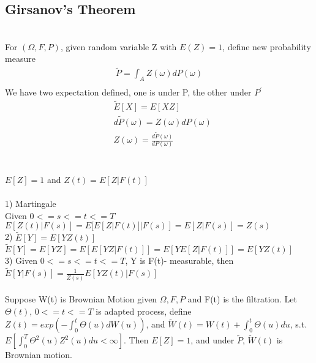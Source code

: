 \documentclass[a4paper]{article}
\begin{document}
\subsection{Girsanov's Theorem}
\\
For $(\Omega, F, P)$, given random variable Z with $E(Z) = 1$, define new probability measure
\begin{align}
	\tilde P = \int_A Z(\omega) dP(\omega)\\
\end{align}
We have two expectation defined, one is under P, the other under $P^{'}$
\begin{align*}
	&\tilde E[X] = E[XZ]\\ 
	&d\tilde P(\omega) = Z(\omega) dP(\omega)\\
	&Z(\omega) = \frac{d\tilde P(\omega)}{dP(\omega)}\\
\end{align*}

\\
$E[Z] = 1$ and $Z(t) = E[Z|F(t)]$\\

\\
1) Martingale\\
Given $0 <= s <=t <= T$\\
$E[Z(t)|F(s)] = E[E[Z|F(t)]|F(s)] = E[Z|F(s)] = Z(s)$\\
2) $\tilde E[Y] = E[YZ(t)]$\\
$\tilde E[Y]=E[YZ] = E[E[YZ|F(t)]]=E[Y E[Z|F(t)]] = E[YZ(t)]$\\
3) Given $0<=s<=t<=T$, Y is F(t)- measurable, then\\
$\tilde E[Y|F(s)] = \frac{1}{Z(s)} E[YZ(t)|F(s)]$\\

\\
Suppose W(t) is Brownian Motion given $\Omega, F, P$ and F(t) is the filtration. Let $\Theta(t)$, $0<=t<=T$ is adapted process, define $Z(t) = exp(-\int_0^{t} \Theta(u) dW(u))$, and $\tilde W(t) = W(t) + \int_0^t \Theta(u) du$, s.t. $E[\int_0^T \Theta^2(u) Z^2(u) du < \infty]$. Then $E[Z]=1$, and under $\tilde P$, $\tilde W(t)$ is Brownian motion.\\
\end{document}
